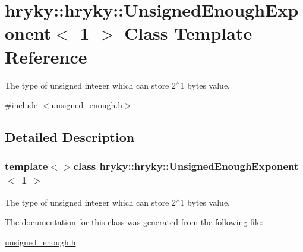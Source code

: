 \hypertarget{classhryky_1_1hryky_1_1_unsigned_enough_exponent_3_011_01_4}{\section{hryky\-:\-:hryky\-:\-:Unsigned\-Enough\-Exponent$<$ 1 $>$ Class Template Reference}
\label{classhryky_1_1hryky_1_1_unsigned_enough_exponent_3_011_01_4}
}


The type of unsigned integer which can store 2$^\wedge$1 bytes value.  




{\ttfamily \#include $<$unsigned\-\_\-enough.\-h$>$}



\subsection{Detailed Description}
\subsubsection*{template$<$$>$class hryky\-::hryky\-::\-Unsigned\-Enough\-Exponent$<$ 1 $>$}

The type of unsigned integer which can store 2$^\wedge$1 bytes value. 

The documentation for this class was generated from the following file\-:\begin{DoxyCompactItemize}
\item 
\hyperlink{unsigned__enough_8h}{unsigned\-\_\-enough.\-h}\end{DoxyCompactItemize}
